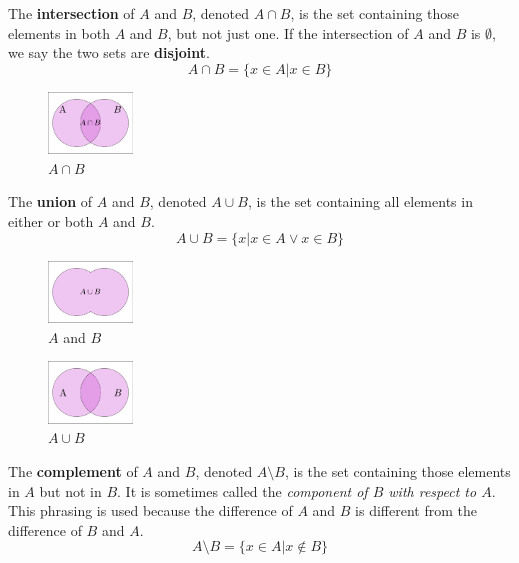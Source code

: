 The \textbf{intersection} of $A$ and $B$, denoted $A \cap B$,
is the set containing those elements in both $A$ and $B$, but not just one.
If the intersection of $A$ and $B$ is $\emptyset$, we say the two sets are \textbf{disjoint}.
\[ A \cap B = \big\{ x \in A | x \in B \big\}\]
\begin{figure}[H]
  \begin{center}
    \includegraphics[width=0.2\textwidth]{discrete/sets/intersection.eps}
  \end{center}
  \caption{$A\cap B$}
\end{figure}The \textbf{union} of $A$ and $B$, denoted $A \cup B$,
is the set containing all elements in either or both $A$ and $B$.
\[ A \cup B = \big\{ x | x \in A \lor x \in B \big\}\]
\begin{figure}[H]
  \begin{center}
    \includegraphics[width=0.2\textwidth]{discrete/sets/union.eps}
  \end{center}
  \caption{$A$ and $B$}
\end{figure}
\begin{figure}[H]
  \begin{center}
    \includegraphics[width=0.2\textwidth]{discrete/sets/preunion.eps}
  \end{center}
  \caption{$A\cup B$}
\end{figure}
The \textbf{complement} of $A$ and $B$, denoted $A \setminus B$,
is the set containing those elements in $A$ but not in $B$.
It is sometimes called the \emph{component of $B$ with respect to $A$}.
This phrasing is used because the difference of $A$ and $B$ is different from the difference of $B$ and $A$.
\[ A \setminus B = \big\{ x \in A \big| x \not\in B \big\} \]

